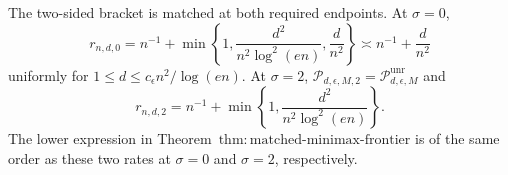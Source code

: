 The two-sided bracket is matched at both required endpoints.  At \(\sigma=0\),
\[
 r_{n,d,0}=n^{-1}+\min\left\{1,\frac{d^2}{n^2\log^2(en)},\frac d{n^2}\right\}
 \asymp n^{-1}+\frac d{n^2}
\]
uniformly for \(1\le d\le c_{\epsilon}n^2/\log(en)\).  At \(\sigma=2\),
\(\mathcal P_{d,\epsilon,M,2}=\mathcal P_{d,\epsilon,M}^{\mathrm{unr}}\) and
\[
 r_{n,d,2}=n^{-1}+\min\left\{1,\frac{d^2}{n^2\log^2(en)}\right\}.
\]
The lower expression in Theorem~\(\mathrm{thm:matched\text{-}minimax\text{-}frontier}\) is of the same order as these two rates at \(\sigma=0\) and \(\sigma=2\), respectively.